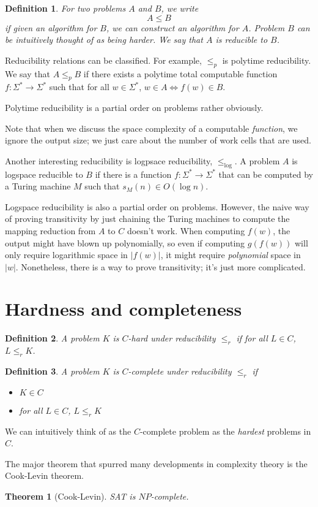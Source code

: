\documentclass{article}
\newtheorem{theorem}{Theorem}
\newtheorem{definition}{Definition}
\begin{document}
\begin{definition}
    For two problems $A$ and $B$, we write $$ A \leq B $$ if given an algorithm
    for $B$, we can construct an algorithm for $A$. Problem $B$ can be
    intuitively thought of as being \emph{harder}. We say that $A$ is
    \emph{reducible} to $B$.
\end{definition}

Reducibility relations can be classified. For example, $\leq_p$ is polytime
reducibility. We say that $A \leq_p B$ if there exists a polytime total
computable function $f : \Sigma^* \to \Sigma^*$ such that for all $w \in
\Sigma^*$, $w \in A \iff f(w) \in B$.

Polytime reducibility is a partial order on problems rather obviously.

Note that when we discuss the space complexity of a computable \emph{function},
we ignore the output size; we just care about the number of work cells that are
used.

Another interesting reducibility is logpsace reducibility, $\leq_{\log{}}$. A
problem $A$ is logspace reducible to $B$ if there is a function
$f : \Sigma^* \to \Sigma^*$ that can be computed by a Turing machine $M$ such
that $s_M(n) \in O(\log n)$.

Logspace reducibility is also a partial order on problems. However, the naive
way of proving transitivity by just chaining the Turing machines to compute the
mapping reduction from $A$ to $C$ doesn't work. When computing $f(w)$, the
output might have blown up polynomially, so even if computing $g(f(w))$ will
only require logarithmic space in $|f(w)|$, it might require \emph{polynomial}
space in $|w|$. Nonetheless, there is a way to prove transitivity; it's just
more complicated.

\section{Hardness and completeness}

\begin{definition}
    A problem $K$ is $C$-hard under reducibility $\leq_r$ if for all
    $L \in C$, $L \leq_r K$.
\end{definition}

\begin{definition}
    A problem $K$ is $C$-complete under reducibility $\leq_r$ if
    \begin{itemize}
        \item
            $K \in C$
        \item
            for all $L \in C$, $L \leq_r K$
    \end{itemize}
\end{definition}

We can intuitively think of as the $C$-complete problem as the \emph{hardest}
problems in $C$.

The major theorem that spurred many developments in complexity theory is the
Cook-Levin theorem.

\begin{theorem}[Cook-Levin]
    SAT is $NP$-complete.
\end{theorem}
\end{document}

